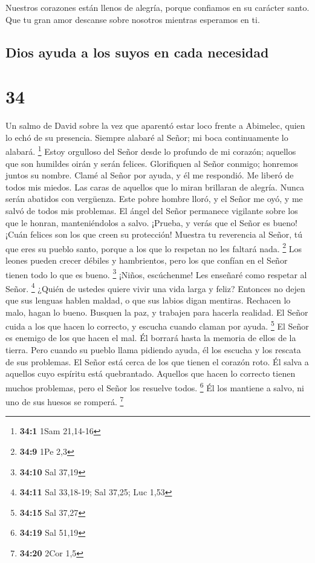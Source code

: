  Nuestros corazones están llenos de alegría, porque
confiamos en su carácter santo.  Que tu gran amor descanse
sobre nosotros mientras esperamos en ti.

\hypertarget{dios-ayuda-a-los-suyos-en-cada-necesidad}{%
\subsection{Dios ayuda a los suyos en cada
necesidad}\label{dios-ayuda-a-los-suyos-en-cada-necesidad}}

\hypertarget{section-33}{%
\section{34}\label{section-33}}

Un salmo de David sobre la vez que aparentó estar loco frente a
Abimelec, quien lo echó de su presencia.  Siempre alabaré al
Señor; mi boca continuamente lo alabará. \footnote{\textbf{34:1} 1Sam
  21,14-16}  Estoy orgulloso del Señor desde lo profundo de
mi corazón; aquellos que son humildes oirán y serán felices.
 Glorifiquen al Señor conmigo; honremos juntos su nombre.
 Clamé al Señor por ayuda, y él me respondió. Me liberó de
todos mis miedos.  Las caras de aquellos que lo miran
brillaran de alegría. Nunca serán abatidos con vergüenza. 
Este pobre hombre lloró, y el Señor me oyó, y me salvó de todos mis
problemas.  El ángel del Señor permanece vigilante sobre los
que le honran, manteniéndolos a salvo.  ¡Prueba, y verás que
el Señor es bueno! ¡Cuán felices son los que creen su protección!
 Muestra tu reverencia al Señor, tú que eres su pueblo
santo, porque a los que lo respetan no les faltará nada. \footnote{\textbf{34:9}
  1Pe 2,3}  Los leones pueden crecer débiles y hambrientos,
pero los que confían en el Señor tienen todo lo que es bueno.
\footnote{\textbf{34:10} Sal 37,19}  ¡Niños, escúchenme!
Les enseñaré como respetar al Señor. \footnote{\textbf{34:11} Sal
  33,18-19; Sal 37,25; Luc 1,53}  ¿Quién de ustedes quiere
vivir una vida larga y feliz?  Entonces no dejen que sus
lenguas hablen maldad, o que sus labios digan mentiras. 
Rechacen lo malo, hagan lo bueno. Busquen la paz, y trabajen para
hacerla realidad.  El Señor cuida a los que hacen lo
correcto, y escucha cuando claman por ayuda. \footnote{\textbf{34:15}
  Sal 37,27}  El Señor es enemigo de los que hacen el mal.
Él borrará hasta la memoria de ellos de la tierra.  Pero
cuando su pueblo llama pidiendo ayuda, él los escucha y los rescata de
sus problemas.  El Señor está cerca de los que tienen el
corazón roto. Él salva a aquellos cuyo espíritu está quebrantado.
 Aquellos que hacen lo correcto tienen muchos problemas,
pero el Señor los resuelve todos. \footnote{\textbf{34:19} Sal 51,19}
 Él los mantiene a salvo, ni uno de sus huesos se romperá.
\footnote{\textbf{34:20} 2Cor 1,5}

